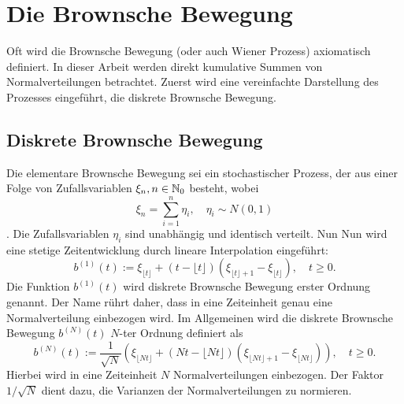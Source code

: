 \section{Die Brownsche Bewegung}

Oft wird die Brownsche Bewegung (oder auch Wiener Prozess) axiomatisch definiert. In dieser Arbeit werden 
direkt kumulative Summen von Normalverteilungen betrachtet. Zuerst wird eine vereinfachte Darstellung des Prozesses eingeführt, 
die diskrete Brownsche Bewegung.

\subsection{Diskrete Brownsche Bewegung}

\begin{defi}
Die elementare Brownsche Bewegung sei ein stochastischer Prozess, 
der aus einer Folge von Zufallsvariablen $\xi_n, n \in \Bbb N_0$ besteht, wobei
$$\xi_n = \sum_{i=1}^n \eta_i, \quad \eta_i \sim N(0,1)$$. 
Die Zufallsvariablen $\eta_i$ sind unabhängig und identisch verteilt. Nun 
Nun wird eine stetige Zeitentwicklung durch lineare Interpolation eingeführt:
$$b^{(1)}(t) := \xi_{\lfloor t \rfloor} + (t - \lfloor t \rfloor)(\xi_{\lfloor t \rfloor + 1} - \xi_{\lfloor t \rfloor}), \quad t \geq 0.$$
Die Funktion $b^{(1)}(t)$ wird diskrete Brownsche Bewegung erster Ordnung genannt.
Der Name rührt daher, dass in eine Zeiteinheit genau eine Normalverteilung einbezogen wird.
Im Allgemeinen wird die diskrete Brownsche Bewegung $b^{(N)}(t)$ $N$-ter Ordnung definiert als
$$b^{(N)}(t) := \frac{1}{\sqrt{N}} \left ( \xi_{\lfloor Nt \rfloor} + (Nt - \lfloor Nt \rfloor)(\xi_{\lfloor Nt \rfloor + 1} - \xi_{\lfloor Nt \rfloor}) \right ), \quad t \geq 0.$$
Hierbei wird in eine Zeiteinheit $N$ Normalverteilungen einbezogen. Der Faktor $1/\sqrt{N}$ dient dazu, die Varianzen der Normalverteilungen zu normieren.

\end{defi}

